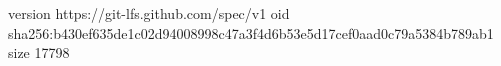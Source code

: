 version https://git-lfs.github.com/spec/v1
oid sha256:b430ef635de1c02d94008998c47a3f4d6b53e5d17cef0aad0c79a5384b789ab1
size 17798
